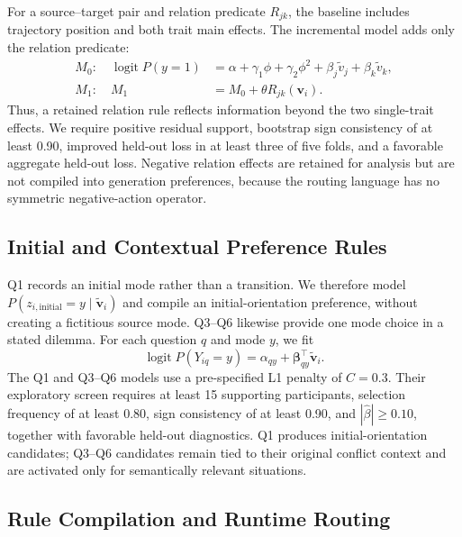 For a source--target pair and relation predicate $R_{jk}$, the baseline includes trajectory position and both trait main effects. The incremental model adds only the relation predicate:
\begin{equation}
\begin{aligned}
M_0:\quad \operatorname{logit}P(y=1) &= \alpha+\gamma_1\phi+\gamma_2\phi^2
+\beta_j\widetilde v_j+\beta_k\widetilde v_k,\\
M_1:\quad M_1 &= M_0+\theta R_{jk}(\mathbf v_i).
\end{aligned}
\label{eq:app_bivariate_transition}
\end{equation}
Thus, a retained relation rule reflects information beyond the two single-trait effects. We require positive residual support, bootstrap sign consistency of at least 0.90, improved held-out loss in at least three of five folds, and a favorable aggregate held-out loss. Negative relation effects are retained for analysis but are not compiled into generation preferences, because the routing language has no symmetric negative-action operator.

\subsection{Initial and Contextual Preference Rules}

Q1 records an initial mode rather than a transition. We therefore model $P(z_{i,\mathrm{initial}}=y\mid\widetilde{\mathbf v}_i)$ and compile an initial-orientation preference, without creating a fictitious source mode. Q3--Q6 likewise provide one mode choice in a stated dilemma. For each question $q$ and mode $y$, we fit
\begin{equation}
\operatorname{logit}P(Y_{iq}=y)
=\alpha_{qy}+\boldsymbol\beta_{qy}^{\top}\widetilde{\mathbf v}_i.
\label{eq:app_contextual_preference}
\end{equation}
The Q1 and Q3--Q6 models use a pre-specified L1 penalty of $C=0.3$. Their exploratory screen requires at least 15 supporting participants, selection frequency of at least 0.80, sign consistency of at least 0.90, and $|\hat\beta|\ge0.10$, together with favorable held-out diagnostics. Q1 produces initial-orientation candidates; Q3--Q6 candidates remain tied to their original conflict context and are activated only for semantically relevant situations.

\subsection{Rule Compilation and Runtime Routing}

